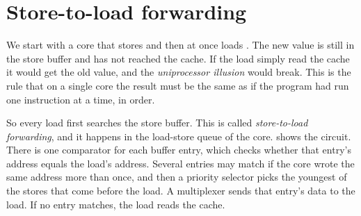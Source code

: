 \section{Store-to-load forwarding}
\label{sec:forwarding}

We start with a core that stores  and then at once loads . The new value is still in the store buffer and has not reached the cache. If the load simply read the cache it would get the old value, and the \emph{uniprocessor illusion} would break. This is the rule that on a single core the result must be the same as if the program had run one instruction at a time, in order.

So every load first searches the store buffer. This is called \emph{store-to-load forwarding}, and it happens in the load-store queue of the core.  shows the circuit. There is one comparator for each buffer entry, which checks whether that entry's address equals the load's address. Several entries may match if the core wrote the same address more than once, and then a priority selector picks the youngest of the stores that come before the load. A multiplexer sends that entry's data to the load. If no entry matches, the load reads the cache.

